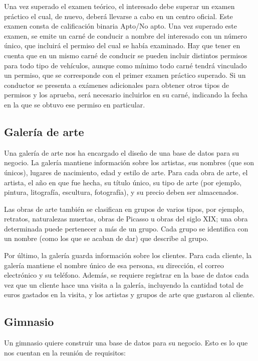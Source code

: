 \documentclass{db-practice}
\begin{document}
Una vez superado el examen teórico, el interesado debe superar un examen práctico el cual, de nuevo, deberá llevarse a cabo en un centro oficial. Este examen consta de calificación binaria Apto/No apto. Una vez superado este examen, se emite un carné de conducir a nombre del interesado con un número único, que incluirá el permiso del cual se había examinado. Hay que tener en cuenta que en un mismo carné de conducir se pueden incluir distintos permisos para todo tipo de vehículos, aunque como mínimo todo carné tendrá vinculado un permiso, que se corresponde con el primer examen práctico superado. Si un conductor se presenta a exámenes adicionales para obtener otros tipos de permisos y los aprueba, será necesario incluirlos en su carné, indicando la fecha en la que se obtuvo ese permiso en particular.

\subsection{Galería de arte}
Una galería de arte nos ha encargado el diseño de una base de datos para su negocio. La galería mantiene información sobre los artistas, sus nombres (que son únicos), lugares de nacimiento, edad y estilo de arte. Para cada obra de arte, el artista, el año en que fue hecha, su título único, su tipo de arte (por ejemplo, pintura, litografía, escultura, fotografía), y su precio deben ser almacenados. 

Las obras de arte también se clasifican en grupos de varios tipos, por ejemplo, retratos, naturalezas muertas, obras de Picasso u obras del siglo XIX; una obra determinada puede pertenecer a más de un grupo. Cada grupo se identifica con un nombre (como los que se acaban de dar) que describe al grupo. 

Por último, la galería guarda información sobre los clientes. Para cada cliente, la galería mantiene el nombre único de esa persona, su dirección, el correo electrónico y su teléfono. Además, se requiere registrar en la base de datos cada vez que un cliente hace una visita a la galería, incluyendo la cantidad total de euros gastados en la visita, y los artistas y grupos de arte que gustaron al cliente.

\subsection{Gimnasio}
Un gimnasio quiere construir una base de datos para su negocio. Esto es lo que nos cuentan en la reunión de requisitos:
\end{document}
